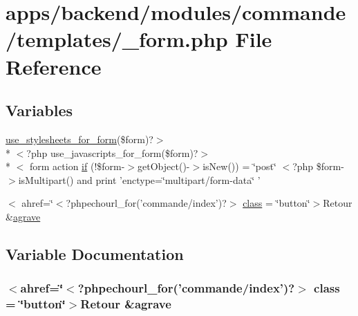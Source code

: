\hypertarget{backend_2modules_2commande_2templates_2__form_8php}{\section{apps/backend/modules/commande/templates/\-\_\-form.php File Reference}
\label{backend_2modules_2commande_2templates_2__form_8php}
}
\subsection*{Variables}
\begin{DoxyCompactItemize}
\item 
\hyperlink{live_2modules_2user_2templates_2__form_8php_a86bc4522fdbe625b07bc4a4d6eec3df7}{use\-\_\-stylesheets\-\_\-for\-\_\-form}(\$form)?$>$\\*
$<$?php use\-\_\-javascripts\-\_\-for\-\_\-form(\$form)?$>$\\*
$<$ form action \hyperlink{backend_2modules_2commande_2templates_2__form_8php_abd1acf0179bbb4a56e04d4fccdbc121f}{if} (!\$form-\/$>$get\-Object()-\/$>$is\-New()) = \char`\"{}post\char`\"{} $<$?php \$form-\/$>$is\-Multipart() and print 'enctype=\char`\"{}multipart/form-\/data\char`\"{} '
\item 
$<$ ahref=\char`\"{}$<$?phpechourl\-\_\-for('commande/index')?$>$ \hyperlink{backend_2modules_2commande_2templates_2__form_8php_ab00214f9c0d5b53fe8898088a6522c65}{class} = \char`\"{}button\char`\"{}$>$Retour \&\hyperlink{presse_2modules_2page_2templates_2concours_ouikos_success_8php_adcbedde811e3c81b65c252edf38caea2}{agrave}
\end{DoxyCompactItemize}


\subsection{Variable Documentation}
\hypertarget{backend_2modules_2commande_2templates_2__form_8php_ab00214f9c0d5b53fe8898088a6522c65}{
\subsubsection[{class}]{\setlength{\rightskip}{0pt plus 5cm}$<$ahref=\char`\"{}$<$?phpechourl\-\_\-for('commande/index')?$>$ class = \char`\"{}button\char`\"{}$>$Retour \&{\bf agrave}}}\label{backend_2modules_2commande_2templates_2__form_8php_ab00214f9c0d5b53fe8898088a6522c65}


